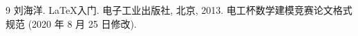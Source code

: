 
\begin{thebibliography}{9}%
    刘海洋.
    \newblock \LaTeX {}入门\allowbreak[J].
    \newblock 电子工业出版社, 北京, 2013.
    电工杯数学建模竞赛论文格式规范 (2020 年 8 月 25 日修改).
\end{thebibliography}
